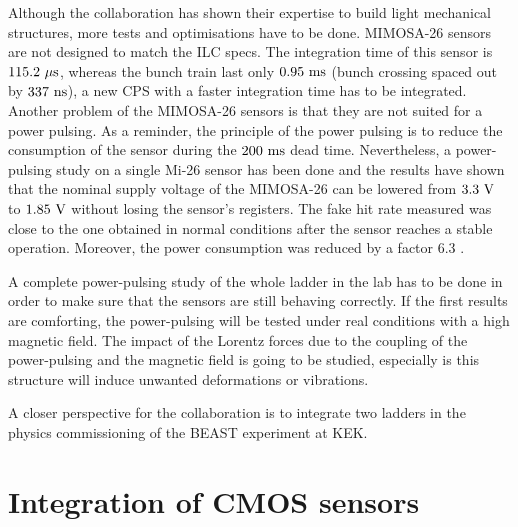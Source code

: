     Although the collaboration has shown their expertise to build light mechanical structures, more tests and optimisations have to be done.
    MIMOSA-26 sensors are not designed to match the \gls{ILC} specs. 
    The integration time of this sensor is $115.2~\rm{\mu s}$, whereas the bunch train last only $0.95~\rm{ms}$ (bunch crossing spaced out by $337~\rm{ns}$), a new CPS with a faster integration time has to be integrated.
    Another problem of the MIMOSA-26 sensors is that they are not suited for a power pulsing. 
    As a reminder, the principle of the power pulsing is to reduce the consumption of the sensor during the $200~\rm{ms}$ dead time. 
    Nevertheless, a power-pulsing study on a single Mi-26 sensor has been done and the results have shown that the nominal supply voltage of the MIMOSA-26 can be lowered from $3.3~\rm{V}$ to $1.85~\rm{V}$ without losing the sensor's registers. 
    The fake hit rate measured was close to the one obtained in  normal conditions after the sensor reaches a stable operation.
    Moreover, the power consumption was reduced by a factor 6.3 \cite{Kuprash2013}. 

    A complete power-pulsing study of the whole ladder in the lab has to be done in order to make sure that the sensors are still behaving correctly.
    If the first results are comforting, the power-pulsing will be tested under real conditions with a high magnetic field.
    The impact of the Lorentz forces due to the coupling of the power-pulsing and the magnetic field is going to be studied, especially is this structure will induce unwanted deformations or vibrations. 


    A closer perspective for the collaboration is to integrate two ladders in the physics commissioning of the \gls{BEAST} experiment at KEK.

  \section{Integration of CMOS sensors}
  \label{sec:CMOS}

